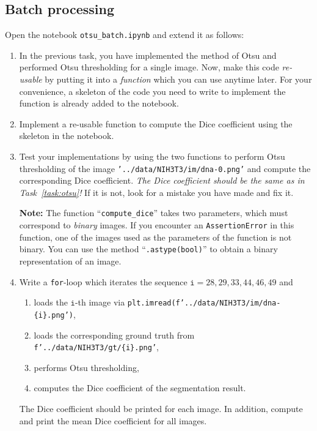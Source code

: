 \documentclass[12pt,a4paper]{article}
\begin{document}
\begin{samepage}
\section{Batch processing}
\label{task:otsu_batch}

Open the notebook \texttt{otsu\_batch.ipynb} and extend it as follows:

\begin{enumerate}
    \item In the previous task, you have implemented the method of Otsu and performed Otsu thresholding for a single image. Now, make this code \emph{re-usable} by putting it into a \emph{function} which you can use anytime later. For your convenience, a skeleton of the code you need to write to implement the function is already added to the notebook.
    \item Implement a re-usable function to compute the Dice coefficient using the skeleton in the notebook.
    \item Test your implementations by using the two functions to perform Otsu thresholding of the image \texttt{'../data/NIH3T3/im/dna-0.png'} and compute the corresponding Dice coefficient. \emph{The Dice coefficient should be the same as in Task~\ref{task:otsu}!} If it is not, look for a mistake you have made and fix it.

    \textbf{Note:} The function ``\texttt{compute\_dice}'' takes two parameters, which must correspond to \emph{binary} images. If you encounter an \texttt{AssertionError} in this function, one of the images used as the parameters of the function is not binary. You can use the method ``\texttt{.astype(bool)}'' to obtain a binary representation of an image.
    
    \item Write a \texttt{for}-loop which iterates the sequence $\texttt{i} = 28,29,33,44,46,49$ and
    \begin{enumerate}
        \item loads the $\texttt{i}$-th image via \texttt{plt.imread(f'../data/NIH3T3/im/dna-\{i\}.png')},
        \item loads the corresponding ground truth from \texttt{f'../data/NIH3T3/gt/\{i\}.png'},
        \item performs Otsu thresholding,
        \item computes the Dice coefficient of the segmentation result.
    \end{enumerate}
    The Dice coefficient should be printed for each image. In addition, compute and print the mean Dice coefficient for all images.
\end{enumerate}
\end{samepage}
\end{document}

